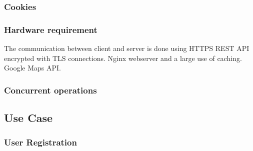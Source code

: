 \documentclass[english]{article}
\newcounter{requirement}
\begin{document}
\subsubsection{Cookies}



\subsubsection{Hardware requirement}
The communication between client and server is done using HTTPS REST API encrypted with TLS connections.
Nginx webserver and a large use of caching.
Google Maps API.



\subsubsection{Concurrent operations}

\pagebreak
\subsection{Use Case}

\subsubsection{User Registration}
\end{document}
